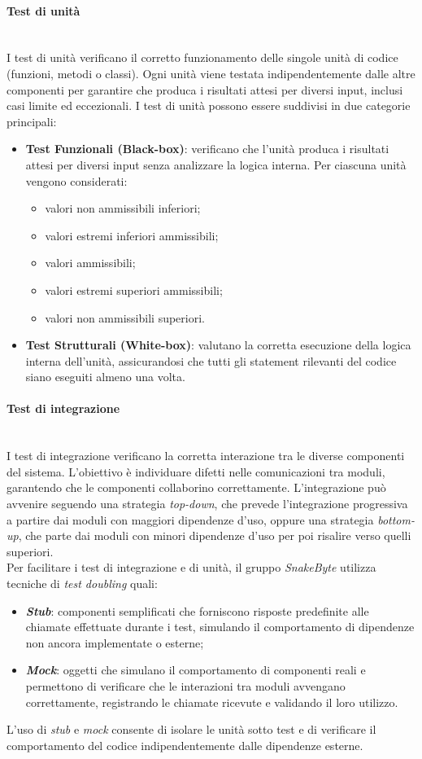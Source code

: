 \documentclass[10pt, letterpaper]{article}
\newcommand{\trisubsection}[1]{\paragraph{#1}\mbox{}\\}
\begin{document}
\trisubsection{Test di unità}
I test di unità verificano il corretto funzionamento delle singole unità di codice (funzioni, metodi o classi).
Ogni unità viene testata indipendentemente dalle altre componenti per garantire
che produca i risultati attesi per diversi input, inclusi casi limite ed
eccezionali.
I test di unità possono essere suddivisi in due categorie principali:
\begin{itemize}
    \item \textbf{Test Funzionali (Black-box)}: verificano che l'unità produca i risultati attesi per diversi input senza analizzare la logica interna. Per ciascuna unità vengono considerati:
          \begin{itemize}
              \item valori non ammissibili inferiori;
              \item valori estremi inferiori ammissibili;
              \item valori ammissibili;
              \item valori estremi superiori ammissibili;
              \item valori non ammissibili superiori.
          \end{itemize}
    \item \textbf{Test Strutturali (White-box)}: valutano la corretta esecuzione della logica interna dell'unità, assicurandosi che tutti gli statement rilevanti del codice siano eseguiti almeno una volta.
\end{itemize}

\trisubsection{Test di integrazione}
I test di integrazione verificano la corretta interazione tra
le diverse componenti del sistema. L'obiettivo è
individuare difetti nelle comunicazioni tra moduli,
garantendo che le componenti collaborino correttamente.
L'integrazione può avvenire seguendo una strategia \textit{top-down}, che prevede
l'integrazione progressiva a partire dai moduli con maggiori dipendenze d'uso, oppure una
strategia \textit{bottom-up}, che parte dai moduli con minori dipendenze d'uso per poi
risalire verso quelli superiori.
\\Per facilitare i test di integrazione e di unità, il gruppo \textit{SnakeByte} utilizza
tecniche di \textit{test doubling} quali:
\begin{itemize}
    \item \textbf{\textit{Stub}}: componenti semplificati che forniscono risposte predefinite
          alle chiamate effettuate durante i test, simulando il comportamento di dipendenze
          non ancora implementate o esterne;
    \item \textbf{\textit{Mock}}: oggetti che simulano il comportamento di componenti reali
          e permettono di verificare che le interazioni tra moduli avvengano correttamente,
          registrando le chiamate ricevute e validando il loro utilizzo.
\end{itemize}
L'uso di \textit{stub} e \textit{mock} consente di isolare le unità sotto test e di
verificare il comportamento del codice indipendentemente dalle dipendenze esterne.
\end{document}
